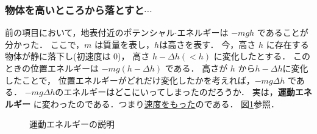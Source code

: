             \subsubsection{物体を高いところから落とすと$\cdots$}
                前の項目において，地表付近のポテンシャル$\cdot$エネルギーは $-mgh$ であることが分かった．
                ここで，$m$ は質量を表し，$h$は高さを表す．
                今，高さ $h$ に存在する物体が静に落下し(初速度は 0)，
                高さ $h-\Delta h(<h)$ に変化したとする．
                このときの位置エネルギーは $-mg\left(h-\Delta h\right)$ である．
                高さが $h$ から$h-\Delta h$に変化したことで，
                位置エネルギーがどれだけ変化したかを考えれば，$-mg\Delta h$ である．
                $-mg\Delta h$のエネルギーはどこにいってしまったのだろうか．
                実は，\textbf{運動エネルギー} に変わったのである．つまり\underline{速度をもった}のである．
                図\ref{fig:KE_fig}参照．
                    \begin{figure}[hbt]
                        \begin{center}
                            \caption{運動エネルギーの説明}
                            \label{fig:KE_fig}
                        \end{center}
                    \end{figure}

